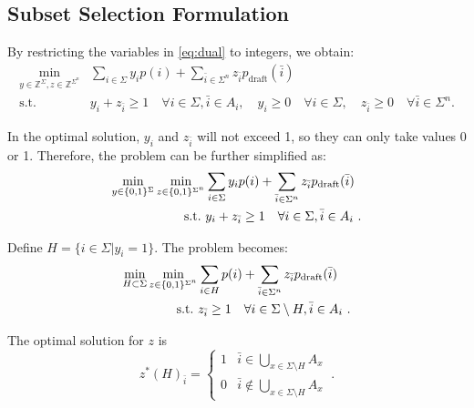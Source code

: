\documentclass{article}
\makeatletter
\newcommand{\myvspace}{\@ifstar\myvspacestar\myvspacenostar}
\newcommand{\myvspacenostar}[1]{}
\newcommand{\myvspacestar}[1]{}
\newcommand{\crvspace}{\@ifstar\crvspacestar\crvspacenostar}
\newcommand{\crvspacenostar}[1]{}
\newcommand{\crvspacestar}[1]{}
\makeatother
\begin{document}
\subsection{Subset Selection Formulation}
\myvspace{-5pt}
\crvspace{-3pt}
By restricting the variables in \eqref{eq:dual} to integers, we obtain:
\myvspace{-3pt}
\crvspace{-2pt}
\begin{equation}
\begin{aligned}
\min_{y\in\mathbb{Z}^{\Sigma},z\in\mathbb{Z}^{\Sigma^n}}  &
\sum_{i \in \Sigma} y_i p(i) + \sum_{\bar{i} \in \Sigma^n} z_{\bar{i}} p_{\text{draft}}(\bar{i}) 
\\
\text{s.t.~} & y_i + z_{\bar{i}} \geq 1 \quad \forall i \in \Sigma, \bar{i} \in A_i,\quad y_i \geq 0 \quad \forall i \in \Sigma, \quad z_{\bar{i}} \geq 0 \quad \forall \bar{i} \in \Sigma^n
.
\end{aligned}
\end{equation}
\par\myvspace{-5pt}
\crvspace{-3pt}
In the optimal solution, $y_i$ and $z_{\bar{i}}$ will not exceed 1, so they can only take values 0 or 1. Therefore, the problem can be further simplified as:
\myvspace{-3pt}
\crvspace{-1pt}
\begin{equation}
\begin{aligned}
\min_{y\in\{0,1\}^{\Sigma}}\min_{z\in\{0,1\}^{\Sigma^n}} & \sum_{i\in\Sigma} y_i p(i)+ \sum_{\bar{i}\in\Sigma^n} z_{\bar{i}} p_{\operatorname{draft}}(\bar{i})
\\
\text{s.t.~} & y_i+z_{\bar{i}}\geq1 \quad \forall i\in\Sigma,\bar{i}\in A_i
~.
\end{aligned}
\end{equation}
\par\myvspace{-5pt}
\crvspace{-3pt}
Define $H=\{i\in\Sigma|y_i=1\}$. The problem becomes:
\myvspace{-3pt}
\crvspace{-1pt}
\begin{equation}
\begin{aligned}
\min_{H\subset\Sigma}\min_{z\in\{0,1\}^{\Sigma^n}} & \sum_{i\in H} p(i)+ \sum_{\bar{i}\in\Sigma^n} z_{\bar{i}} p_{\operatorname{draft}}(\bar{i})
\\
\text{s.t.~} & z_{\bar{i}}\geq1  \quad \forall i\in\Sigma\setminus H,\bar{i}\in A_i
~.
\end{aligned}
\end{equation}
\par\myvspace{-5pt}
\crvspace{-3pt}
The optimal solution for $z$ is
\myvspace{-5pt}
\crvspace{-2pt}
\begin{equation}
z^\ast(H)_{\bar{i}}=\begin{cases}1&\bar{i}\in\bigcup_{x\in \Sigma\setminus H} A_x\\0&\bar{i}\notin\bigcup_{x\in \Sigma\setminus H} A_x\end{cases}
~.
\end{equation}
\end{document}
